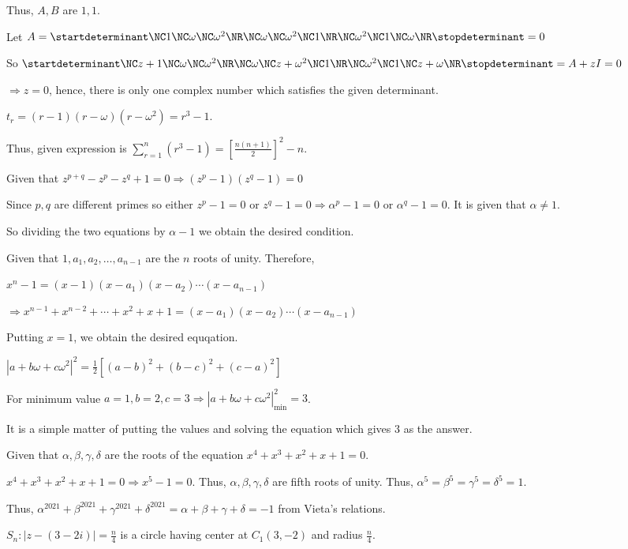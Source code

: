   Thus, $A, B$ are $1, 1$.
\item Let $A = \startdeterminant\NC 1\NC \omega \NC \omega^2\NR\NC \omega \NC \omega^2 \NC
  1\NR\NC \omega^2\NC 1\NC \omega\NR\stopdeterminant = 0$

  So $\startdeterminant\NC z + 1\NC \omega \NC \omega^2\NR\NC \omega \NC z + \omega^2 \NC
  1\NR\NC \omega^2\NC 1\NC z + \omega\NR\stopdeterminant = A + zI = 0$

  $\Rightarrow z = 0$, hence, there is only one complex number which satisfies the given determinant.
\item $t_r = (r - 1)(r - \omega)(r - \omega^2) = r^3 - 1$.

  Thus, given expression is $\sum_{r = 1}^n(r^3 - 1) = \left[\frac{n(n + 1)}{2}\right]^2 - n$.
\item Given that $z^{p + q} - z^p - z^q + 1 = 0 \Rightarrow \left(z^p - 1\right)(z^q - 1) = 0$

  Since $p, q$ are different primes so either $z^p - 1 = 0$ or $z^q - 1 = 0 \Rightarrow \alpha^p - 1 = 0$ or
  $\alpha^q - 1 = 0$. It is given that $\alpha \neq 1$.

  So dividing the two equations by $\alpha - 1$ we obtain the desired condition.
\item Given that $1, a_1, a_2, \ldots, a_{n - 1}$ are the $n$ roots of unity. Therefore,

  $x^n - 1 = (x - 1)(x - a_1)(x - a_2) \cdots (x - a_{n - 1})$

  $\Rightarrow x^{n - 1} + x^{n - 2} + \cdots + x^2 + x + 1 = (x - a_1)(x - a_2) \cdots (x - a_{n - 1})$

  Putting $x = 1$, we obtain the desired equqation.
\item $|a + b\omega + c\omega^2|^2 = \frac{1}{2}[(a - b)^2 + (b - c)^2 + (c - a)^2]$

  For minimum value $a = 1, b = 2, c = 3\Rightarrow |a + b\omega + c\omega^2|_{\min}^2 = 3$.
\item It is a simple matter of putting the values and solving the equation which gives $3$ as the answer.
\item Given that $\alpha, \beta, \gamma, \delta$ are the roots of the equation $x^4 + x^3 + x^2 + x + 1 =
  0$.

  $x^4 + x^3 + x^2 + x + 1 = 0\Rightarrow x^5 - 1 = 0$. Thus, $\alpha, \beta, \gamma, \delta$ are fifth
  roots of unity. Thus, $\alpha^5 = \beta^5 = \gamma^5 = \delta^5 = 1$.

  Thus, $\alpha^{2021} + \beta^{2021} + \gamma^{2021} + \delta^{2021} = \alpha + \beta + \gamma + \delta =
  -1$ from Vieta's relations.
\item $S_n: |z - (3 - 2i)| = \frac{n}{4}$ is a circle having center at $C_1(3, -2)$ and radius
  $\frac{n}{4}$.

